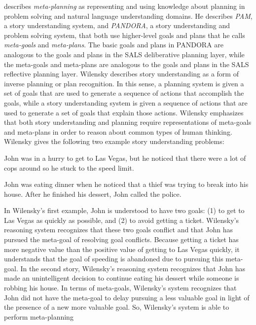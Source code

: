 \cite{wilensky:1981} describes {\emph{meta-planning}} as representing
and using knowledge about planning in problem solving and natural
language understanding domains.  He describes {\emph{PAM}}, a story
understanding system, and {\emph{PANDORA}}, a story understanding and
problem solving system, that both use higher-level goals and plans
that he calls {\emph{meta-goals}} and {\emph{meta-plans}}.  The basic
goals and plans in PANDORA are analogous to the goals and plans in the
SALS deliberative planning layer, while the meta-goals and meta-plans
are analogous to the goals and plans in the SALS reflective planning
layer.  Wilensky describes story understanding as a form of inverse
planning or plan recognition.  In this sense, a planning system is
given a set of goals that are used to generate a sequence of actions
that accomplish the goals, while a story understanding system is given
a sequence of actions that are used to generate a set of goals that
explain those actions.  Wilensky emphasizes that both story
understanding and planning require representations of meta-goals and
meta-plans in order to reason about common types of human thinking.
Wilensky gives the following two example story understanding problems:
\begin{packed_enumerate}
\item{John was in a hurry to get to Las Vegas, but he noticed that
  there were a lot of cops around so he stuck to the speed limit.}
\item{John was eating dinner when he noticed that a thief was trying
  to break into his house.  After he finished his dessert, John called
  the police.}
\end{packed_enumerate}
In Wilensky's first example, John is understood to have two goals: (1)
to get to Las Vegas as quickly as possible, and (2) to avoid getting a
ticket.  Wilensky's reasoning system recognizes that these two goals
conflict and that John has pursued the meta-goal of resolving goal
conflicts.  Because getting a ticket has more negative value than the
positive value of getting to Las Vegas quickly, it understands that
the goal of speeding is abandoned due to pursuing this meta-goal.  In
the second story, Wilensky's reasoning system recognizes that John has
made an unintelligent decision to continue eating his dessert while
someone is robbing his house.  In terms of meta-goals, Wilensky's
system recognizes that John did not have the meta-goal to delay
pursuing a less valuable goal in light of the presence of a new more
valuable goal.  So, Wilensky's system is able to perform meta-planning
